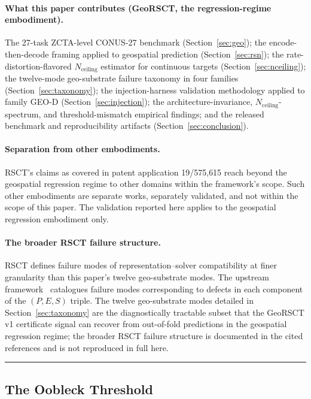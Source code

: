 \documentclass{article}
\begin{document}
\paragraph{What this paper contributes (GeoRSCT, the regression-regime embodiment).}
The 27-task ZCTA-level CONUS-27 benchmark (Section~\ref{sec:geo}); the encode-then-decode framing applied to geospatial prediction (Section~\ref{sec:rsn}); the rate-distortion-flavored $N_{\text{ceiling}}$ estimator for continuous targets (Section~\ref{sec:nceiling}); the twelve-mode geo-substrate failure taxonomy in four families (Section~\ref{sec:taxonomy}); the injection-harness validation methodology applied to family GEO-D (Section~\ref{sec:injection}); the architecture-invariance, $N_{\text{ceiling}}$-spectrum, and threshold-mismatch empirical findings; and the released benchmark and reproducibility artifacts (Section~\ref{sec:conclusion}).

\paragraph{Separation from other embodiments.}
RSCT's claims as covered in patent application 19/575{,}615 reach beyond the geospatial regression regime to other domains within the framework's scope. Such other embodiments are separate works, separately validated, and not within the scope of this paper. The validation reported here applies to the geospatial regression embodiment only.

\paragraph{The broader RSCT failure structure.}
RSCT defines failure modes of representation--solver compatibility at finer granularity than this paper's twelve geo-substrate modes. The upstream framework~\citep{martin2026rsct} catalogues failure modes corresponding to defects in each component of the $(P, E, S)$ triple. The twelve geo-substrate modes detailed in Section~\ref{sec:taxonomy} are the diagnostically tractable subset that the GeoRSCT v1 certificate signal can recover from out-of-fold predictions in the geospatial regression regime; the broader RSCT failure structure is documented in the cited references and is not reproduced in full here.

\noindent\rule{\textwidth}{0.8pt}

\subsection{The Oobleck Threshold}
\end{document}
